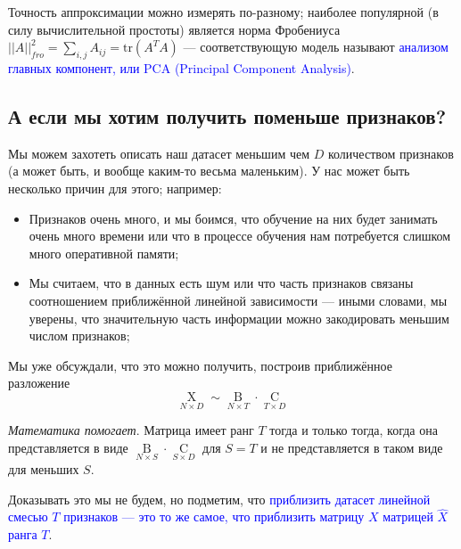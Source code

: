 \documentclass{amsart}
\theoremstyle{definition}
\theoremstyle{remark}
\numberwithin{equation}{section}
\begin{document}
Точность аппроксимации можно измерять по-разному; наиболее популярной (в силу вычислительной простоты) является норма Фробениуса $||A||_{fro}^2 = \sum_{i,j}A_{ij} = \mathrm{tr}(A^TA)$ --- соответствующую модель называют \textcolor{blue}{анализом главных компонент, или PCA (Principal Component Analysis)}.

\subsection{А если мы хотим получить поменьше признаков?} Мы можем захотеть описать наш датасет меньшим чем $D$ количеством признаков (а может быть, и вообще каким-то весьма маленьким). У нас может быть несколько причин для этого; например:
\begin{itemize}
\item Признаков очень много, и мы боимся, что обучение на них будет занимать очень много времени или что в процессе обучения нам потребуется слишком много оперативной памяти;
\item Мы считаем, что в данных есть шум или что часть признаков связаны соотношением приближённой линейной зависимости --- иными словами, мы уверены, что значительную часть информации можно закодировать меньшим числом признаков;
\end{itemize}
Мы уже обсуждали, что это можно получить, построив приближённое разложение
$$\underset{N\times D}{\operatorname{X}} \sim \underset{N\times T}{\operatorname{B}} \cdot \underset{T\times D}{\operatorname{C}}$$

\textit{Математика помогает}. Матрица имеет ранг $T$ тогда и только тогда, когда она представляется в виде $\underset{N\times S}{\operatorname{B}} \cdot \underset{S\times D}{\operatorname{C}}$ для $S = T$ и не представляется в таком виде для меньших $S$.

Доказывать это мы не будем, но подметим, что \textcolor{blue}{приблизить датасет линейной смесью $T$ признаков --- это то же самое, что приблизить матрицу $X$ матрицей $\hat{X}$ ранга $T$}.
\end{document}
